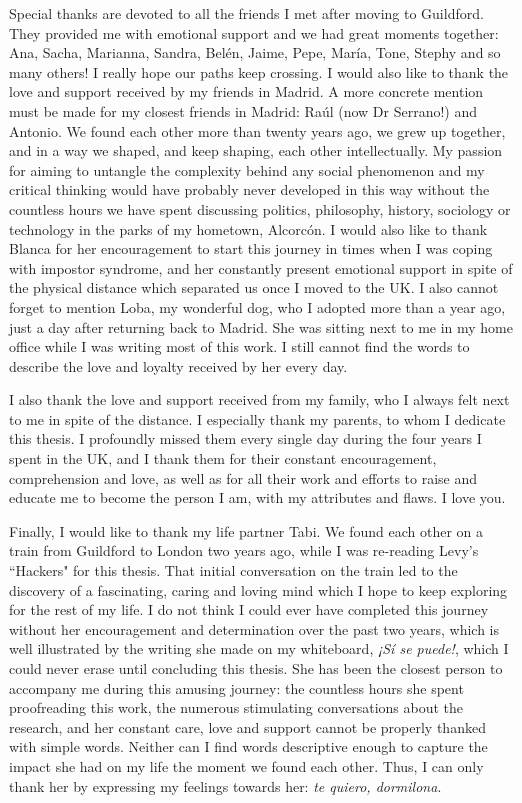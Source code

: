Special thanks are devoted to all the friends I met after moving to Guildford. They provided me with emotional support and we had great moments together: Ana, Sacha, Marianna, Sandra, Belén, Jaime, Pepe, María, Tone, Stephy and so many others! I really hope our paths keep crossing. I would also like to thank the love and support received by my friends in Madrid. A more concrete mention must be made for my closest friends in Madrid: Raúl (now Dr Serrano!) and Antonio. We found each other more than twenty years ago, we grew up together, and in a way we shaped, and keep shaping, each other intellectually. My passion for aiming to untangle the complexity behind any social phenomenon and my critical thinking would have probably never developed in this way without the countless hours we have spent discussing politics, philosophy, history, sociology or technology in the parks of my hometown, Alcorcón. I would also like to thank Blanca for her encouragement to start this journey in times when I was coping with impostor syndrome, and her constantly present emotional support in spite of the physical distance which separated us once I moved to the UK. I also cannot forget to mention Loba, my wonderful dog, who I adopted more than a year ago, just a day after returning back to Madrid. She was sitting next to me in my home office while I was writing most of this work. I still cannot find the words to describe the love and loyalty received by her every day.

I also thank the love and support received from my family, who I always felt next to me in spite of the distance. I especially thank my parents, to whom I dedicate this thesis. I profoundly missed them every single day during the four years I spent in the UK, and I thank them for their constant encouragement, comprehension and love, as well as for all their work and efforts to raise and educate me to become the person I am, with my attributes and flaws. I love you.

Finally, I would like to thank my life partner Tabi. We found each other on a train from Guildford to London two years ago, while I was re-reading Levy's ``Hackers" for this thesis. That initial conversation on the train led to the discovery of a fascinating, caring and loving mind which I hope to keep exploring for the rest of my life. I do not think I could ever have completed this journey without her encouragement and determination over the past two years, which is well illustrated by  the writing she made on my whiteboard, \textit{¡Sí se puede!}, which I could never erase until concluding this thesis. She has been the closest person to accompany me during this amusing journey: the countless hours she spent proofreading this work, the numerous stimulating conversations about the research, and her constant care, love and support cannot be properly thanked with simple words. Neither can I find words descriptive enough to capture the impact she had on my life the moment we found each other. Thus, I can only thank her by expressing my feelings towards her: \textit{te quiero, dormilona}.